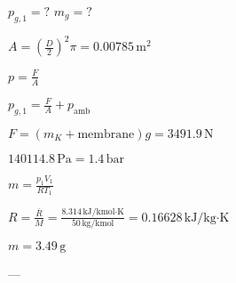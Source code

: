 \( p_{g,1} = ? \)  
\( m_g = ? \)  

\( A = \left(\frac{D}{2}\right)^2 \pi = 0.00785 \, \text{m}^2 \)  

\( p = \frac{F}{A} \)  

\( p_{g,1} = \frac{F}{A} + p_{\text{amb}} \)  

\( F = (m_K + \text{membrane}) g = 3491.9 \, \text{N} \)  

\( 140114.8 \, \text{Pa} = 1.4 \, \text{bar} \)  

\( m = \frac{p_1 V_1}{R T_1} \)  

\( R = \frac{\overline{R}}{M} = \frac{8.314 \, \text{kJ/kmol·K}}{50 \, \text{kg/kmol}} = 0.16628 \, \text{kJ/kg·K} \)  

\( m = 3.49 \, \text{g} \)  

---